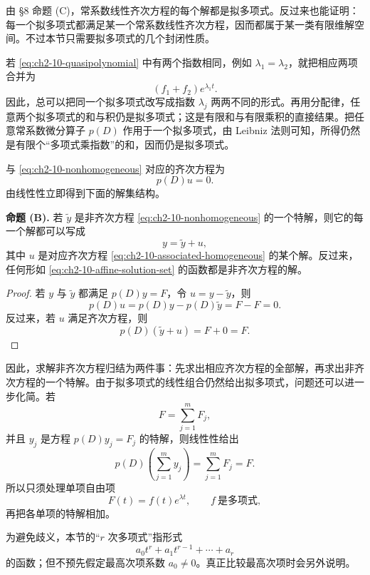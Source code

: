 由 §8 命题 (C)，常系数线性齐次方程的每个解都是拟多项式。反过来也能证明：每一个拟多项式都满足某一个常系数线性齐次方程，因而都属于某一类有限维解空间。不过本节只需要拟多项式的几个封闭性质。

若 \eqref{eq:ch2-10-quasipolynomial} 中有两个指数相同，例如 \(\lambda_1=\lambda_2\)，就把相应两项合并为
\[
 (f_1+f_2)e^{\lambda_1t}.
\]
因此，总可以把同一个拟多项式改写成指数 \(\lambda_j\) 两两不同的形式。再用分配律，任意两个拟多项式的和与积仍是拟多项式；这是有限和与有限乘积的直接结果。把任意常系数微分算子 \(p(D)\) 作用于一个拟多项式，由 Leibniz 法则可知，所得仍然是有限个“多项式乘指数”的和，因而仍是拟多项式。

与 \eqref{eq:ch2-10-nonhomogeneous} 对应的齐次方程为
\begin{equation}
 p(D)u=0.
 \label{eq:ch2-10-associated-homogeneous}
\end{equation}
由线性性立即得到下面的解集结构。

\medskip
\noindent\textbf{命题 (B).}
若 \(\widetilde y\) 是非齐次方程 \eqref{eq:ch2-10-nonhomogeneous} 的一个特解，则它的每一个解都可以写成
\begin{equation}
 y=\widetilde y+u,
 \label{eq:ch2-10-affine-solution-set}
\end{equation}
其中 \(u\) 是对应齐次方程 \eqref{eq:ch2-10-associated-homogeneous} 的某个解。反过来，任何形如 \eqref{eq:ch2-10-affine-solution-set} 的函数都是非齐次方程的解。

\begin{proof}
若 \(y\) 与 \(\widetilde y\) 都满足 \(p(D)y=F\)，令 \(u=y-\widetilde y\)，则
\[
 p(D)u=p(D)y-p(D)\widetilde y=F-F=0.
\]
反过来，若 \(u\) 满足齐次方程，则
\[
 p(D)(\widetilde y+u)=F+0=F.
\]
\end{proof}

因此，求解非齐次方程归结为两件事：先求出相应齐次方程的全部解，再求出非齐次方程的一个特解。由于拟多项式的线性组合仍然给出拟多项式，问题还可以进一步化简。若
\[
 F=\sum_{j=1}^mF_j,
\]
并且 \(y_j\) 是方程 \(p(D)y_j=F_j\) 的特解，则线性性给出
\[
 p(D)\left(\sum_{j=1}^m y_j\right)=\sum_{j=1}^mF_j=F.
\]
所以只须处理单项自由项
\begin{equation}
 F(t)=f(t)e^{\lambda t},
 \qquad f\ \text{是多项式},
 \label{eq:ch2-10-single-quasipolynomial}
\end{equation}
再把各单项的特解相加。

为避免歧义，本节的“\(r\) 次多项式”指形式
\[
 a_0t^r+a_1t^{r-1}+\cdots+a_r
\]
的函数；但不预先假定最高次项系数 \(a_0\ne0\)。真正比较最高次项时会另外说明。

